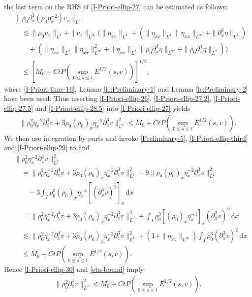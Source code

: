 \documentclass[11pt, reqno]{amsart}
\newcommand{\diff}{\mathrm{d}}
\numberwithin{equation}{section}
\begin{document}
the last term on the RHS of \eqref{I-Priori-ellip-27} can be estimated as follows:
\begin{equation}\label{I-Priori-ellip-28.5}
\begin{aligned}
&\|\rho_0\partial_x^3(\rho_0\eta_x^{-2})v_{x}\|_{L^2}\\
&\quad\lesssim \|\rho_0v_{x}\|_{L^2}+
\|v_{x}\|_{L^\infty}\big(\|\eta_{xx}\|_{L^2}
+(\|\eta_{xx}\|_{L^2}\|\eta_{xx}\|_{L^\infty}
+\|\partial_x^3\eta\|_{L^2})\\
&\qquad+(\|\eta_{xx}\|_{L^2}\|\eta_{xx}\|_{L^\infty}^2
+\|\eta_{xx}\|_{L^2}\|\rho_0\partial_x^3\eta\|_{L^\infty}
+\|\rho_0\partial_x^4\eta\|_{L^2})\big)\\
&\quad\leq [M_0+Ct P(\sup_{0\leq s\leq t}E^{1/2}(s,v))]^{1/2},
\end{aligned}
\end{equation}
where \eqref{I-Priori-time-16}, Lemma \ref{le:Preliminary-1} and Lemma \ref{le:Preliminary-2} have been used.
Thus inserting \eqref{I-Priori-ellip-26}, \eqref{I-Priori-ellip-27.2}, \eqref{I-Priori-ellip-27.5} and \eqref{I-Priori-ellip-28.5} into \eqref{I-Priori-ellip-27} yields
\begin{equation}\label{I-Priori-ellip-29}
\begin{aligned}
\|\rho_0^2\eta_x^{-2}\partial_x^4v+3\rho_0(\rho_0)_x\eta_x^{-2}\partial_x^3v\|_{L^2}^2\leq M_0+Ct P(\sup_{0\leq s\leq t}E^{1/2}(s,v)).
\end{aligned}
\end{equation}
We then use integration by parts and invoke \eqref{Preliminary-5}, \eqref{I-Priori-ellip-third} and \eqref{I-Priori-ellip-29} to find
\begin{equation}\label{I-Priori-ellip-30}
\begin{aligned}
&\|\rho_0^2\eta_x^{-2}\partial_x^4v\|_{L^2}^2\\
&\quad=\|\rho_0^2\eta_x^{-2}\partial_x^4v+3\rho_0(\rho_0)_x\eta_x^{-2}\partial_x^3v\|_{L^2}^2
-9\|\rho_0(\rho_0)_x\eta_x^{-2}\partial_x^3v\|_{L^2}^2\\
&\qquad-3\int_I\rho_0^3(\rho_0)_x\eta_x^{-4}[(\partial_x^3v)^2]_x\,\diff x\\
&\quad= \|\rho_0^2\eta_x^{-2}\partial_x^4v+3\rho_0(\rho_0)_x\eta_x^{-2}\partial_x^3v\|_{L^2}^2+\int_I\rho_0^3[(\rho_0)_x\eta_x^{-4}]_x(\partial_x^3v)^2\,\diff x\\
&\quad\lesssim \|\rho_0^2\eta_x^{-2}\partial_x^4v+3\rho_0(\rho_0)_x\eta_x^{-2}\partial_x^3v\|_{L^2}^2+(1+\|\eta_{xx}\|_{L^\infty})
\int_I\rho_0^3(\partial_x^3v)^2\,\diff x\\
&\quad\leq M_0+Ct P(\sup_{0\leq s\leq t}E^{1/2}(s,v)).
\end{aligned}
\end{equation}
Hence \eqref{I-Priori-ellip-30} and \eqref{eta-bound} imply
\begin{equation}\label{I-Priori-ellip-31}
\begin{aligned}
\|\rho_0^2\partial_x^4v\|_{L^2}^2\leq M_0+Ct P(\sup_{0\leq s\leq t}E^{1/2}(s,v)).
\end{aligned}
\end{equation}
\end{document}
